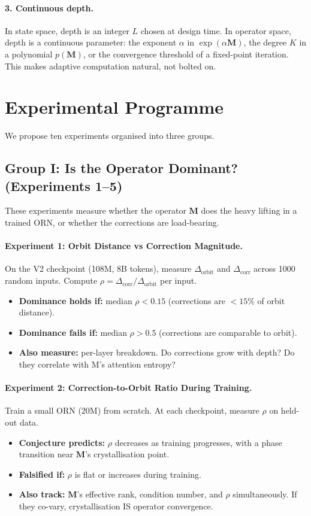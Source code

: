 \documentclass[11pt, a4paper]{article}
\newcommand{\M}{\mathbf{M}}
\theoremstyle{plain}
\theoremstyle{definition}
\theoremstyle{remark}
\begin{document}
\paragraph{3. Continuous depth.}
In state space, depth is an integer $L$ chosen at design time.
In operator space, depth is a continuous parameter: the exponent $\alpha$ in $\exp(\alpha \M)$, the degree $K$ in a polynomial $p(\M)$, or the convergence threshold of a fixed-point iteration.
This makes adaptive computation natural, not bolted on.


\section{Experimental Programme}

We propose ten experiments organised into three groups.

\subsection{Group I: Is the Operator Dominant? (Experiments 1--5)}

These experiments measure whether the operator $\M$ does the heavy lifting in a trained ORN, or whether the corrections are load-bearing.

\paragraph{Experiment 1: Orbit Distance vs Correction Magnitude.}
On the V2 checkpoint (108M, 8B tokens), measure $\Delta_{\mathrm{orbit}}$ and $\Delta_{\mathrm{corr}}$ across 1000 random inputs.
Compute $\rho = \Delta_{\mathrm{corr}} / \Delta_{\mathrm{orbit}}$ per input.
\begin{itemize}[nosep]
\item \textbf{Dominance holds if:} median $\rho < 0.15$ (corrections are $<15\%$ of orbit distance).
\item \textbf{Dominance fails if:} median $\rho > 0.5$ (corrections are comparable to orbit).
\item \textbf{Also measure:} per-layer breakdown. Do corrections grow with depth? Do they correlate with M's attention entropy?
\end{itemize}

\paragraph{Experiment 2: Correction-to-Orbit Ratio During Training.}
Train a small ORN (20M) from scratch. At each checkpoint, measure $\rho$ on held-out data.
\begin{itemize}[nosep]
\item \textbf{Conjecture predicts:} $\rho$ decreases as training progresses, with a phase transition near $\M$'s crystallisation point.
\item \textbf{Falsified if:} $\rho$ is flat or increases during training.
\item \textbf{Also track:} $\M$'s effective rank, condition number, and $\rho$ simultaneously. If they co-vary, crystallisation IS operator convergence.
\end{itemize}
\end{document}
